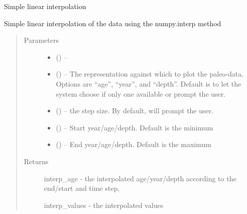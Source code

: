 \documentclass[letterpaper,10pt,english]{sphinxmanual}
\begin{document}

\begin{fulllineitems}
\label{\detokenize{Main:pyleoclim.interpTs}}
Simple linear interpolation

Simple linear interpolation of the data using the numpy.interp method
\begin{quote}\begin{description}
\item[{Parameters}] \leavevmode\begin{itemize}
\item {} 
\sphinxstyleliteralstrong{, } () -- 

\item {} 
 () -- The representation against which to plot the paleo-data.
Options are ``age'', ``year'', and ``depth''. Default is to let the
system choose if only one available or prompt the user.

\item {} 
 () -- the step size. By default, will prompt the user.

\item {} 
 () -- Start year/age/depth. Default is the minimum

\item {} 
 () -- End year/age/depth. Default is the maximum

\end{itemize}

\item[{Returns}] \leavevmode

interp\_age - the interpolated age/year/depth according to the end/start
and time step,

interp\_values - the interpolated values


\end{description}\end{quote}

\end{fulllineitems}
\end{document}
